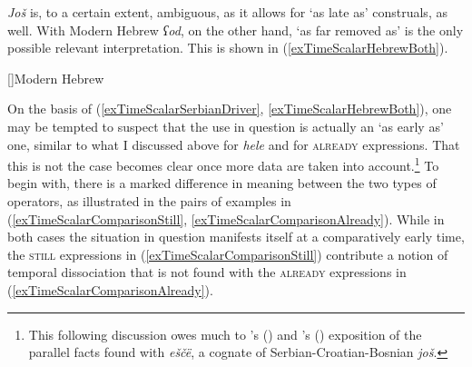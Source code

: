 \textit{Još} is, to a certain extent, ambiguous, as it allows for \lq as late as\rq{ }construals, as well. With Modern Hebrew \textit{ʕod}, on the other hand, \lq as far removed as\rq{ }is the only possible relevant interpretation. This is shown in (\ref{exTimeScalarHebrewBoth}).

\begin{exe}
	\ex \label{exTimeScalarHebrewBoth}
	\begin{xlist}
		\exi{}[]{Modern Hebrew}
	\end{xlist}
\end{exe}

On the basis of (\ref{exTimeScalarSerbianDriver}, \ref{exTimeScalarHebrewBoth}), one may be tempted to suspect that the use in question is actually an \lq as early as\rq{ }one, similar to what I discussed above for  \textit{hele} and for \textsc{already} expressions. That this is not the case becomes clear once more data are taken into account.\footnote{This following discussion owes much to \citeauthor{Boguslavsky1996}'s (\citeyear{Boguslavsky1996})  and  \citeauthor{Mustajoki1988}'s (\citeyear{Mustajoki1988}) exposition of the parallel facts found with  \textit{eščë}, a cognate of Serbian\hyp Croatian\hyp Bosnian \textit{još}.} To begin with, there is a marked difference in meaning between the two types of operators, as illustrated in the pairs of examples in  (\ref{exTimeScalarComparisonStill}, \ref{exTimeScalarComparisonAlready}). While in both cases the situation in question manifests itself at a comparatively early time, the \textsc{still} expressions in (\ref{exTimeScalarComparisonStill}) contribute a notion of temporal dissociation that is not found with the \textsc{already} expressions in (\ref{exTimeScalarComparisonAlready}).

